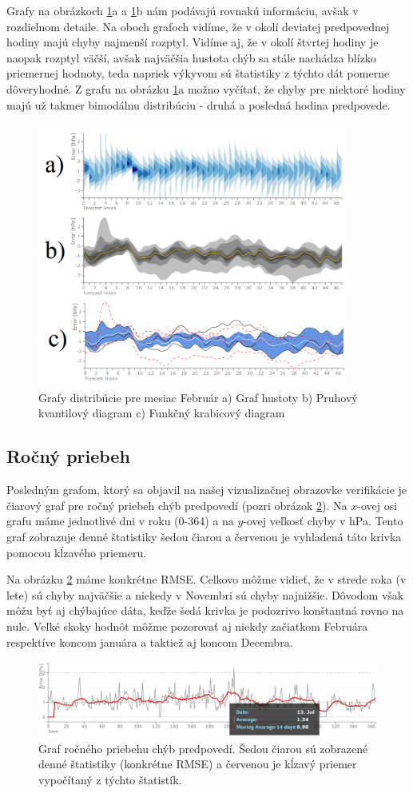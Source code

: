 Grafy na obrázkoch \ref{fig:distrib}a a \ref{fig:distrib}b nám podávajú rovnakú informáciu, avšak v rozdielnom detaile. Na oboch grafoch vidíme, že v okolí deviatej predpovednej hodiny majú chyby najmenší rozptyl. Vidíme aj, že v okolí štvrtej hodiny je naopak rozptyl väčší, avšak najväčšia hustota chýb sa stále nachádza blízko priemernej hodnoty, teda napriek výkyvom sú štatistiky z týchto dát pomerne dôveryhodné. Z grafu na obrázku \ref{fig:distrib}a možno vyčítať, že chyby pre niektoré hodiny majú už takmer bimodálnu distribúciu - druhá a posledná hodina predpovede.


\begin{figure}
	\centering
	\includegraphics[width = 4in]{distrib}
	\caption{Grafy distribúcie pre mesiac Február a) Graf hustoty b) Pruhový kvantilový diagram c) Funkčný krabicový diagram}
	\label{fig:distrib} 
\end{figure}

\subsection{Ročný priebeh}
Posledným grafom, ktorý sa objavil na našej vizualizačnej obrazovke verifikácie je čiarový graf pre ročný priebeh chýb predpovedí (pozri obrázok \ref{fig:progress}). Na \mbox{$ x $-ovej} osi grafu máme jednotlivé dni v roku (0-364) a na \mbox{$ y $-ovej} veľkosť chyby v hPa. Tento graf zobrazuje denné štatistiky šedou čiarou a červenou je vyhladená táto krivka pomocou kĺzavého priemeru.

Na obrázku \ref{fig:progress} máme konkrétne RMSE. Celkovo môžme vidieť, že v strede roka (v lete) sú chyby najväčšie a niekedy v Novembri sú chyby najnižšie. Dôvodom však môžu byť aj chýbajúce dáta, keďže šedá krivka je podozrivo konštantná rovno na nule. Veľké skoky hodnôt môžme pozorovať aj niekdy začiatkom Februára respektíve koncom januára a taktiež aj koncom Decembra.


\begin{figure}
	\centering
	\includegraphics[width = 6in]{progress}
	\caption{Graf ročného priebehu chýb predpovedí. Šedou čiarou sú zobrazené denné štatistiky (konkrétne RMSE) a červenou je kĺzavý priemer vypočítaný z týchto štatistík. }
	\label{fig:progress} 
\end{figure}